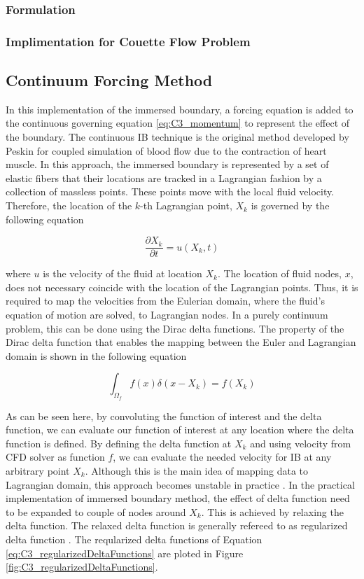 \subsubsection{Formulation}
\subsubsection{Implimentation for Couette Flow Problem}
\subsection{Continuum Forcing Method}
In this implementation of the immersed boundary, a forcing equation is added to the continuous governing equation \eqref{eq:C3_momentum} to represent the effect of the boundary. The continuous IB technique is the original method developed by Peskin \cite{peskin1972flow} for coupled simulation of blood flow due to the contraction of heart muscle. In this approach, the immersed boundary is represented by a set of elastic fibers that their locations are tracked in a Lagrangian fashion by a collection of massless points. These points move with the local fluid velocity. Therefore, the location of the $k$-th Lagrangian point, $X_k$ is governed by the following equation

\begin{equation}
	\frac{\partial X_k}{\partial t} = u(X_k, t)
\end{equation}

where $u$ is the velocity of the fluid at location $X_k$. The location of fluid nodes, $x$, does not necessary coincide with the location of the Lagrangian points. Thus, it is required to map the velocities from the Eulerian domain, where the fluid's equation of motion are solved, to Lagrangian nodes. In a purely continuum problem, this can be done using the Dirac delta functions. The property of the Dirac delta function that enables the mapping between the Euler and Lagrangian domain is shown in the following equation

\begin{equation}
	\int_{\Omega_f} f(x) \delta(x - X_k) = f(X_k)
\end{equation}

As can be seen here, by convoluting the function of interest and the delta function, we can evaluate our function of interest at any location where the delta function is defined. By defining the delta function at $X_k$ and using velocity from CFD solver as function $f$, we can evaluate the needed velocity for IB at any arbitrary point $X_k$. Although this is the main idea of mapping data to Lagrangian domain, this approach becomes unstable in practice \cite{lee2003stability}. In the practical implementation of immersed boundary method, the effect of delta function need to be expanded to couple of nodes around $X_k$. This is achieved by relaxing the delta function. The relaxed delta function is generally refereed to as regularized delta function \cite{shin2008assessment}. The reqularized delta functions of Equation \eqref{eq:C3_regularizedDeltaFunctions} are ploted in Figure \ref{fig:C3_regularizedDeltaFunctions}.

